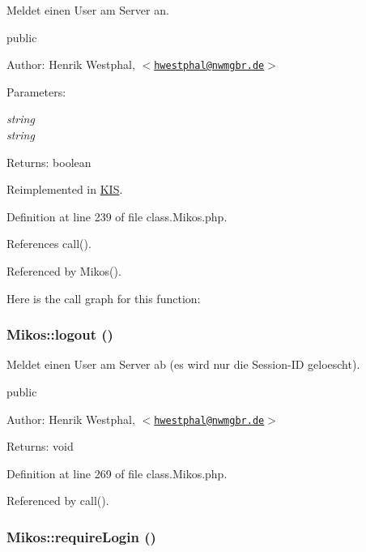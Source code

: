 Meldet einen User am Server an.

public \begin{Desc}
\item[Author:]Henrik Westphal, $<$\href{mailto:hwestphal@nwmgbr.de}{\tt hwestphal@nwmgbr.de}$>$ \end{Desc}
\begin{Desc}
\item[Parameters:]
\begin{description}
\item[{\em string}]\item[{\em string}]\end{description}
\end{Desc}
\begin{Desc}
\item[Returns:]boolean \end{Desc}


Reimplemented in \hyperlink{class_k_i_s_46fbc5ab041178822e533227438a32ad}{KIS}.

Definition at line 239 of file class.Mikos.php.

References call().

Referenced by Mikos().

Here is the call graph for this function:\hypertarget{class_mikos_19b0af84462a7a9acabffdc9d7894b2b}{
\subsubsection{\setlength{\rightskip}{0pt plus 5cm}Mikos::logout ()}}
\label{class_mikos_19b0af84462a7a9acabffdc9d7894b2b}


Meldet einen User am Server ab (es wird nur die Session-ID geloescht).

public \begin{Desc}
\item[Author:]Henrik Westphal, $<$\href{mailto:hwestphal@nwmgbr.de}{\tt hwestphal@nwmgbr.de}$>$ \end{Desc}
\begin{Desc}
\item[Returns:]void \end{Desc}


Definition at line 269 of file class.Mikos.php.

Referenced by call().\hypertarget{class_mikos_e37f254bc7fdba53a43813dbc792c314}{
\subsubsection{\setlength{\rightskip}{0pt plus 5cm}Mikos::requireLogin ()}}
\label{class_mikos_e37f254bc7fdba53a43813dbc792c314}



